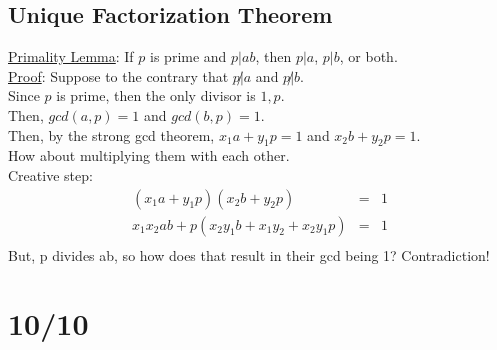 \documentclass[13pt]{article}
\begin{document}
	\subsection*{Unique Factorization Theorem}
		\underline{Primality Lemma}: If $p$ is prime and $p | ab$, then $p | a$,
		$p | b$, or both.\\
		\underline{Proof}: Suppose to the contrary that $p \not| a$ and $p 
		\not| b$.\\
		Since $p$ is prime, then the only divisor is $1, p$.\\
		Then, $gcd(a, p) = 1$ and $gcd(b, p) = 1$. \\
		Then, by the strong gcd theorem, $x_1a + y_1p = 1$ and $x_2b + y_2p = 
		1$.\\
		How about multiplying them with each other. \\
		Creative step: 
		\begin{eqnarray*}
			(x_1a + y_1p)(x_2b+y_2p) & = & 1 \\
			x_1x_2ab + p(x_2y_1b + x_1y_2 + x_2y_1p) & = & 1\\
		\end{eqnarray*}
		But, p divides ab, so how does that result in their gcd being 1?
		Contradiction!

\section*{10/10}
\end{document}
